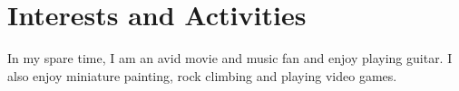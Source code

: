 \section{Interests and Activities}\label{sec:interests-and-activities}
In my spare time, I am an avid movie and music fan and enjoy playing guitar.
I also enjoy miniature painting, rock climbing and playing video games.